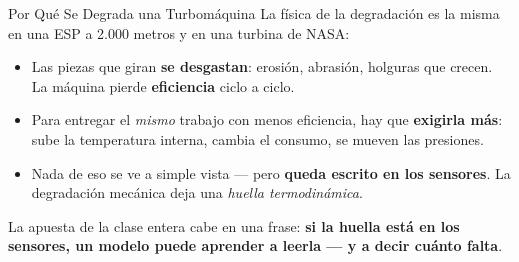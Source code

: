 \documentclass[aspectratio=169, 11pt]{beamer}
\begin{document}
\begin{frame}[shrink=8]{Por Qué Se Degrada una Turbomáquina}
  \vspace{2pt}
  {\footnotesize\color{textMuted}
  La física de la degradación es la misma en una ESP a 2.000 metros y en
  una turbina de NASA:}
  \vspace{7pt}
  {\footnotesize
    \begin{itemize}\setlength{\itemsep}{8pt}
    \item[{\color{arcaRed}\faCog}]
      Las piezas que giran \textbf{se desgastan}: erosión, abrasión,
      holguras que crecen. La máquina pierde \textbf{eficiencia}
      ciclo a ciclo.
    \item[{\color{arcaRed}\faFire}]
      Para entregar el \emph{mismo} trabajo con menos eficiencia, hay que
      \textbf{exigirla más}: sube la temperatura interna, cambia el
      consumo, se mueven las presiones.
    \item[{\color{arcaRed}\faSearch}]
      Nada de eso se ve a simple vista --- pero \textbf{queda escrito en
      los sensores}. La degradación mecánica deja una \emph{huella
      termodinámica}.
    \end{itemize}}
  \vspace{8pt}
  \begin{tcolorbox}[colback=arcaGray, colframe=arcaDark, boxrule=0pt, leftrule=3pt,
    arc=3pt, left=8pt, right=8pt, top=5pt, bottom=5pt]
    {\footnotesize\color{arcaDark}
     La apuesta de la clase entera cabe en una frase: \textbf{si la huella
     está en los sensores, un modelo puede aprender a leerla --- y a decir
     cuánto falta}.}
  \end{tcolorbox}
\end{frame}
\end{document}
